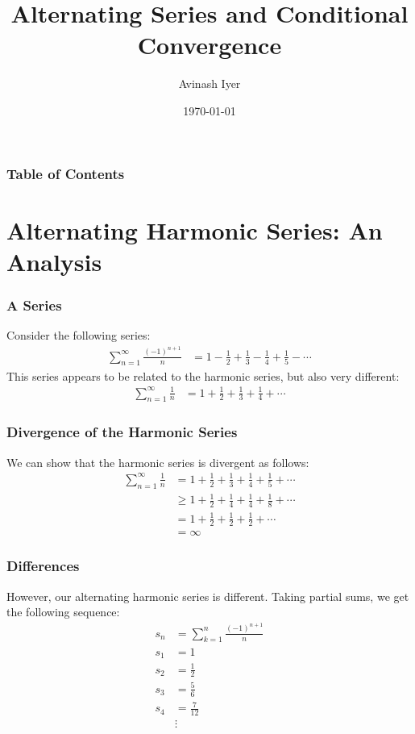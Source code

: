\documentclass{beamer}
\title{Alternating Series and Conditional Convergence}
\author{Avinash Iyer}
\institute{Occidental College}
\date{\today} %
\begin{document}
\begin{frame}
    \titlepage
\end{frame}
\begin{frame}
  \frametitle{Table of Contents}
  \tableofcontents
\end{frame}
\section{Alternating Harmonic Series: An Analysis}
\begin{frame}
  \frametitle{A Series}
  Consider the following series: \pause
  \begin{align*}
    \sum_{n=1}^{\infty} \frac{(-1)^{n + 1}}{n} &= 1 - \frac{1}{2} + \frac{1}{3} - \frac{1}{4} + \frac{1}{5} - \cdots
  \end{align*} \pause
  This series appears to be related to the harmonic series, but also very different:
  \begin{align*}
    \sum_{n=1}^{\infty}\frac{1}{n} &= 1 + \frac{1}{2} + \frac{1}{3} + \frac{1}{4} + \cdots \tag*{Harmonic Series}
  \end{align*}
\end{frame}
\begin{frame}
  \frametitle{Divergence of the Harmonic Series}
  We can show that the harmonic series is divergent as follows:
  \begin{align*}
    \sum_{n=1}^{\infty}\frac{1}{n} &= 1 + \frac{1}{2} + \frac{1}{3} + \frac{1}{4} + \frac{1}{5} + \cdots\\
                                   &\geq 1 + \frac{1}{2} + \frac{1}{4} + \frac{1}{4} + \frac{1}{8} + \cdots\\
                                   &= 1 + \frac{1}{2} + \frac{1}{2} + \frac{1}{2} + \cdots\\
                                   &= \infty
  \end{align*}
\end{frame}
\begin{frame}
  \frametitle{Differences}
  However, our alternating harmonic series is different. Taking partial sums, we get the following sequence:
  \begin{align*}
    s_{n} &= \sum_{k=1}^{n} \frac{(-1)^{n+1}}{n}\\
    s_{1} &= 1\\
    s_{2} &= \frac{1}{2}\\
    s_{3} &= \frac{5}{6}\\
    s_{4} &= \frac{7}{12}\\
          &\vdots
  \end{align*}
\end{frame}
\end{document}
